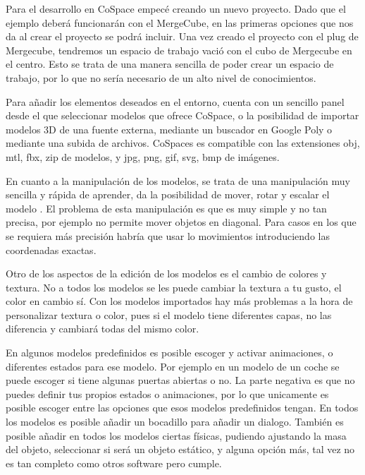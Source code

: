 Para el desarrollo en CoSpace empecé creando un nuevo proyecto. Dado que el ejemplo deberá funcionarán con el MergeCube, en las primeras opciones que nos da al crear el proyecto se podrá incluir.
Una vez creado el proyecto con el plug de Mergecube, tendremos un espacio de trabajo vació con el cubo de Mergecube en el centro. Esto se trata de una manera sencilla de poder crear un espacio de trabajo, por lo que no sería necesario de un alto nivel de conocimientos.

Para añadir los elementos deseados en el entorno, cuenta con un sencillo panel desde el que seleccionar modelos que ofrece CoSpace, o la posibilidad de importar modelos 3D de una fuente externa, mediante un buscador en Google Poly o mediante una subida de archivos. CoSpaces es compatible con las extensiones obj, mtl, fbx, zip de modelos, y jpg, png, gif, svg, bmp de imágenes.

En cuanto a la manipulación de los modelos, se trata de una manipulación muy sencilla y rápida de aprender, da la posibilidad de mover, rotar y escalar el modelo . El problema de esta manipulación es que es muy simple y no tan precisa, por ejemplo no permite mover objetos en diagonal. Para casos en los que se requiera más precisión habría que usar lo movimientos introduciendo las coordenadas exactas.

Otro de los aspectos de la edición de los modelos es el cambio de colores y textura. No a todos los modelos se les puede cambiar la textura a tu gusto, el color en cambio sí. Con los modelos importados hay más problemas a la hora de personalizar textura o color, pues si el modelo tiene diferentes capas, no las diferencia y cambiará todas del mismo color. 

En algunos modelos predefinidos es posible escoger y activar animaciones, o diferentes estados para ese modelo. Por ejemplo en un modelo de un coche se puede escoger si tiene algunas puertas abiertas o no. La parte negativa es que no puedes definir tus propios estados o animaciones, por lo que unicamente es posible escoger entre las opciones que esos modelos predefinidos tengan. En todos los modelos es posible añadir un bocadillo para añadir un dialogo. También es posible añadir en todos los modelos ciertas físicas, pudiendo ajustando la masa del objeto, seleccionar si será un objeto estático, y alguna opción más, tal vez no es tan completo como otros software pero cumple.

